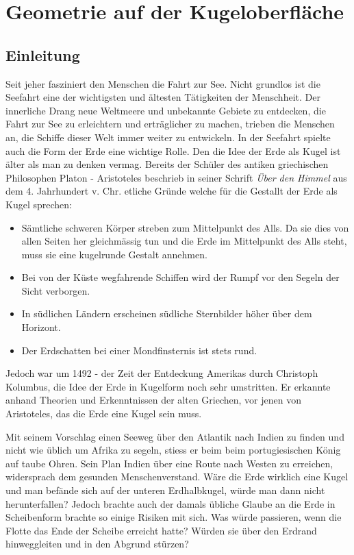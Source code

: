 \chapter{Geometrie auf der Kugeloberfläche\label{chapter:kugel}}
\begin{refsection}

\section{Einleitung}
Seit jeher fasziniert den Menschen die Fahrt zur See. Nicht grundlos ist die Seefahrt eine der wichtigsten und ältesten Tätigkeiten der Menschheit. Der innerliche Drang neue Weltmeere und unbekannte Gebiete zu entdecken, die Fahrt zur See zu erleichtern und erträglicher zu machen, trieben die Menschen an, die Schiffe dieser Welt immer weiter zu entwickeln.
In der Seefahrt spielte auch die Form der Erde eine wichtige Rolle. Den die Idee der Erde als Kugel ist älter als man zu denken vermag. Bereits der Schüler des antiken griechischen Philosophen Platon - Aristoteles beschrieb in seiner Schrift \textit{Über den Himmel} aus dem 4. Jahrhundert v. Chr. etliche Gründe welche für die Gestallt der Erde als Kugel sprechen:
\begin{itemize}
      \item Sämtliche schweren Körper streben zum Mittelpunkt des Alls. Da sie dies von allen Seiten her gleichmässig tun und die Erde im Mittelpunkt des Alls steht, muss sie eine kugelrunde Gestalt annehmen. 
\item Bei von der Küste wegfahrende Schiffen wird der Rumpf vor den Segeln der Sicht verborgen. 
\item In südlichen Ländern erscheinen südliche Sternbilder höher über dem Horizont.
\item Der Erdschatten bei einer Mondfinsternis ist stets rund.
\end{itemize}

Jedoch war um 1492 - der Zeit der Entdeckung Amerikas durch Christoph Kolumbus, die Idee der Erde in Kugelform noch sehr umstritten. Er erkannte anhand Theorien und Erkenntnissen der alten Griechen, vor jenen von Aristoteles, das die Erde eine Kugel sein muss.

Mit seinem Vorschlag einen Seeweg über den Atlantik nach Indien zu finden und nicht wie üblich um Afrika zu segeln, stiess er beim beim portugiesischen König auf taube Ohren. Sein Plan Indien über eine Route nach Westen zu erreichen, widersprach dem gesunden Menschenverstand. Wäre die Erde wirklich eine Kugel und man befände sich auf der unteren Erdhalbkugel, würde man dann nicht herunterfallen? Jedoch brachte auch der damals übliche Glaube an die Erde in Scheibenform brachte so einige Risiken mit sich. Was würde passieren, wenn die Flotte das Ende der Scheibe erreicht hatte? Würden sie über den Erdrand hinweggleiten und in den Abgrund stürzen?


\end{refsection}
